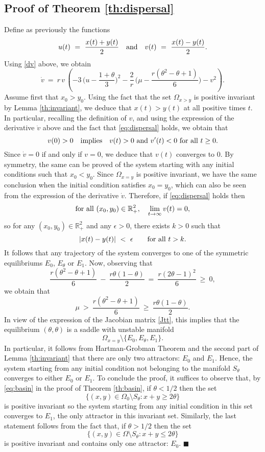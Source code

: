 \subsection*{Proof of Theorem \ref{th:dispersal}}

\indent Define as previously the functions
 $$ u (t) \ = \ \frac{x (t) + y (t)}{2} \quad \hbox{and} \quad v (t) \ = \ \frac{x (t) - y (t)}{2}. $$
 Using \eqref{dv} above, we obtain
 $$ \dot{v} \ = \ r \,v \,\left(-3 \,\bigg(u - \frac{1 + \theta}{3} \bigg)^2 - \frac{2}{r} \,\bigg(\mu - \frac{r (\theta^2 - \theta + 1)}{6} \bigg) - v^2 \right). $$
 Assume first that $x_0 > y_0$.
 Using the fact that the set $\Omega_{x > y}$ is positive invariant by Lemma \ref{th:invariant}, we deduce that $x (t) > y (t)$ at
 all positive times $t$.
 In particular, recalling the definition of $v$, and using the expression of the derivative $\dot{v}$ above and the fact
 that \eqref{eq:dispersal} holds, we obtain that
 $$ v (0) > 0 \quad \hbox{implies} \quad v (t) > 0 \ \hbox{and} \ v' (t) < 0 \ \hbox{for all} \ t \geq 0. $$
 Since $\dot{v} = 0$ if and only if $v = 0$, we deduce that $v (t)$ converges to 0.
 By symmetry, the same can be proved of the system starting with any initial conditions such that $x_0 < y_0$.
 Since $\Omega_{x = y}$ is positive invariant, we have the same conclusion when the initial condition satisfies $x_0 = y_0$, which can
 also be seen from the expression of the derivative $\dot{v}$.
 Therefore, if \eqref{eq:dispersal} holds then
 $$ \hbox{for all} \ (x_0, y_0) \in {{\mathbb{R}}}^2_+, \quad \lim_{t {{\rightarrow}} \infty} v (t) = 0, $$
 so for any  $(x_0, y_0) \in {{\mathbb{R}}}^2_+$ and any $\epsilon > 0$, there exists $k > 0$ such that
 $$ |x (t) - y(t)| \ < \ \epsilon \qquad \hbox{for all} \ t > k. $$
 It follows that any trajectory of the system converges to one of the symmetric equilibriums $E_0$, $E_{\theta}$ or $E_1$.
 Now, observing that
 $$ \frac{r (\theta^2 - \theta + 1)}{6} \ - \ \frac{r \theta (1 - \theta)}{2} \ = \ \frac{r (2 \theta - 1)^2}{6} \ \geq \ 0, $$
 we obtain that
 $$ \mu \ > \ \frac{r (\theta^2 - \theta + 1)}{6} \ \geq \ \frac{r \theta (1 - \theta)}{2}. $$
 In view of the expression of the Jacobian matrix \eqref{Jtt}, this implies that the equilibrium $(\theta, \theta)$ is a saddle
 with unstable manifold
 $$ \Omega_{x = y} \setminus \{E_0, E_{\theta}, E_1 \}. $$
 In particular, it follows from Hartman-Grobman Theorem and the second part of Lemma \ref{th:invariant} that there are only two
 attractors: $E_0$ and $E_1$.
 Hence, the system starting from any initial condition not belonging to the manifold $S_{\theta}$ converges to
 either $E_0$ or $E_1$.
 To conclude the proof, it suffices to observe that, by \eqref{eq:basin} in the proof of Theorem \ref{th:basin}, if $\theta < 1/2$
 then the set
 $$ \{(x, y) \in \Omega_0 \setminus S_{\theta} : x + y \geq 2 \theta\} $$
 is positive invariant so the system starting from any initial condition in this set converges to $E_1$, the only attractor in
 this invariant set.
 Similarly, the last statement follows from the fact that, if $\theta > 1/2$ then the set
 $$ \{(x, y) \in \Omega \setminus S_{\theta} : x + y \leq 2 \theta\} $$
 is positive invariant and contains only one attractor: $E_0$. \hspace{2mm} $\blacksquare$

